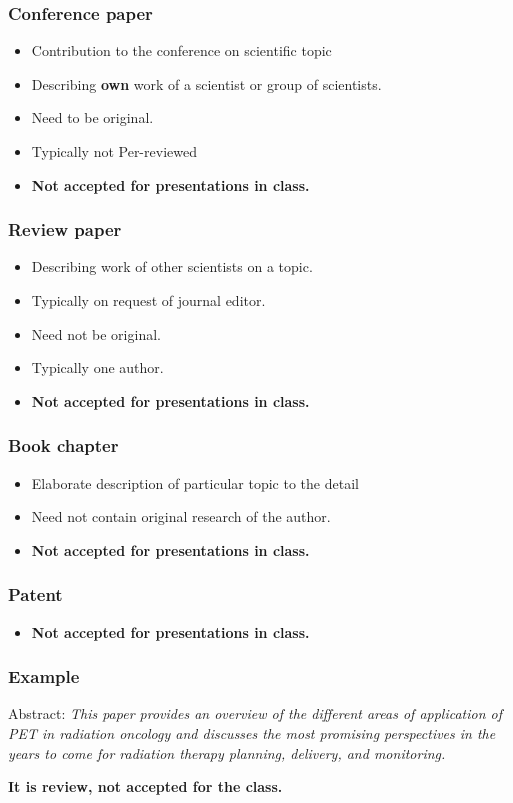 \begin{frame}
\frametitle{Conference paper}
\begin{itemize}
\item Contribution to the conference on scientific topic
\item Describing \textbf{own} work of a scientist or group of scientists.
\item Need to be original.
\item Typically not Per-reviewed
\item \textbf{Not accepted for presentations in class.}
\end{itemize}
\end{frame}

\begin{frame}
\frametitle{Review paper}
\begin{itemize}
\item Describing work of other scientists on a topic.
\item Typically on request of journal editor.
\item Need not be original.
\item Typically one author.
\item \textbf{Not accepted for presentations in class.}
\end{itemize}
\end{frame}

\begin{frame}
\frametitle{Book chapter}
\begin{itemize}
\item Elaborate description of particular topic to the detail
\item Need not contain original research of the author.
\item \textbf{Not accepted for presentations in class.}
\end{itemize}
\end{frame}

\begin{frame}
\frametitle{Patent}
\begin{itemize}
\item \textbf{Not accepted for presentations in class.}
\end{itemize}
\end{frame}

\begin{frame}
\frametitle{Example}


\pause
Abstract: \textit{
This paper provides an overview of the different areas of application of PET in radiation oncology and discusses the most promising perspectives in the years to come for radiation therapy planning, delivery, and monitoring.}
\pause

\textbf{It is review, not accepted for the class.}
\end{frame}

